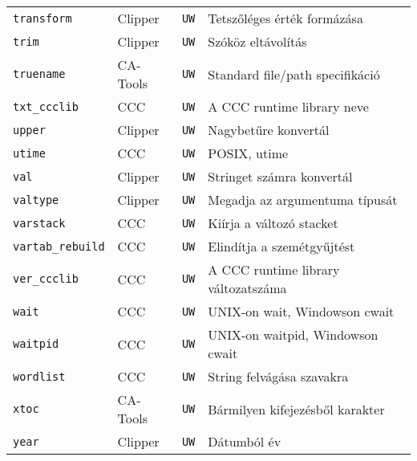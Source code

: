 \begin{tabular}{|l|l|l|l|}
\verb!transform!                   & Clipper  &  {\tt UW} & Tetszőléges érték formázása\\
\verb!trim!                        & Clipper  &  {\tt UW} & Szóköz eltávolítás\\
\verb!truename!                    & CA-Tools &  {\tt UW} & Standard file/path specifikáció\\
\verb!txt_ccclib!                  & CCC      &  {\tt UW} & A CCC runtime library neve\\
\verb!upper!                       & Clipper  &  {\tt UW} & Nagybetűre konvertál\\
\verb!utime!                       & CCC      &  {\tt UW} & POSIX, utime\\
\verb!val!                         & Clipper  &  {\tt UW} & Stringet számra konvertál\\
\verb!valtype!                     & Clipper  &  {\tt UW} & Megadja az argumentuma típusát\\
\verb!varstack!                    & CCC      &  {\tt UW} & Kiírja a változó stacket\\
\verb!vartab_rebuild!              & CCC      &  {\tt UW} & Elindítja a szemétgyűjtést\\
\verb!ver_ccclib!                  & CCC      &  {\tt UW} & A CCC runtime library változatszáma\\
\verb!wait!                        & CCC      &  {\tt UW} & UNIX-on wait, Windowson cwait\\
\verb!waitpid!                     & CCC      &  {\tt UW} & UNIX-on waitpid, Windowson cwait\\
\verb!wordlist!                    & CCC      &  {\tt UW} & String felvágása szavakra\\
\verb!xtoc!                        & CA-Tools &  {\tt UW} & Bármilyen kifejezésből karakter\\
\verb!year!                        & Clipper  &  {\tt UW} & Dátumból év\\   
\end{tabular}
